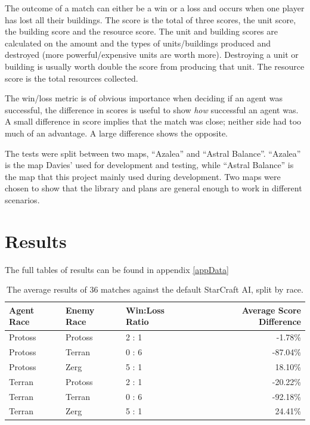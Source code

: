 \documentclass[11pt,openright,a4paper]{report}
\begin{document}
The outcome of a match can either be a win or a loss and occurs when one player has lost all their buildings. The score is the total of three scores, the unit score, the building score and the resource score. The unit and building scores are calculated on the amount and the types of units/buildings produced and destroyed (more powerful/expensive units are worth more). Destroying a unit or building is usually worth double the score from producing that unit. The resource score is the total resources collected.

The win/loss metric is of obvious importance when deciding if an agent was successful, the difference in scores is useful to show \textit{how} successful an agent was. A small difference in score implies that the match was close; neither side had too much of an advantage. A large difference shows the opposite.

The tests were split between two maps, ``Azalea'' and ``Astral Balance''. ``Azalea'' is the map Davies' used for development and testing, while ``Astral Balance'' is the map that this project mainly used during development. Two maps were chosen to show that the library and plans are general enough to work in different scenarios.

\section{Results}
The full tables of results can be found in appendix \ref{appData}

\begin{table}[t]
  \centering
  \begin{tabular}{| l | l | l | r |}
    \hline
    Agent Race & Enemy Race & Win:Loss Ratio & Average Score Difference \\ \hline
    Protoss & Protoss & 2 : 1 & -1.78\% \\
    Protoss & Terran  & 0 : 6 & -87.04\% \\
    Protoss & Zerg    & 5 : 1 & 18.10\% \\
    \hline
    Terran & Protoss & 2 : 1 & -20.22\% \\
    Terran & Terran  & 0 : 6 & -92.18\% \\
    Terran & Zerg    & 5 : 1 & 24.41\% \\
    \hline
  \end{tabular}
  \caption{The average results of 36 matches against the default StarCraft AI, split by race.}
  \label{TPTable}
\end{table}
\end{document}
